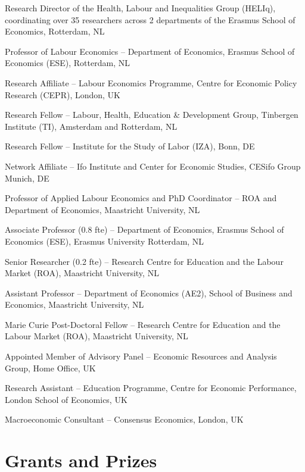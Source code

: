 \documentclass[11pt,a4paper]{article}
\begin{document}
\begin{datelist}
  \item[2024 --] Research Director of the Health, Labour and Inequalities Group (HELIq), coordinating over 35 researchers across 2 departments of the Erasmus School of Economics, Rotterdam, NL
  \item[2017 --] Professor of Labour Economics -- Department of Economics, Erasmus School of Economics (ESE), Rotterdam, NL
  \item[2017 --] Research Affiliate -- Labour Economics Programme, Centre for Economic Policy Research (CEPR), London, UK
  \item[2016 --] Research Fellow -- Labour, Health, Education \& Development Group, Tinbergen Institute (TI), Amsterdam and Rotterdam, NL
  \item[2014 --] Research Fellow -- Institute for the Study of Labor (IZA), Bonn, DE
  \item[2013 --] Network Affiliate -- Ifo Institute and Center for Economic Studies, CESifo Group Munich, DE
  \item[2017 -- 2023] Professor of Applied Labour Economics and PhD Coordinator -- ROA and Department of Economics, Maastricht University, NL
  \item[2016 -- 2017] Associate Professor (0.8 fte) -- Department of Economics, Erasmus School of Economics (ESE), Erasmus University Rotterdam, NL
  \item[2016 -- 2017] Senior Researcher (0.2 fte) -- Research Centre for Education and the Labour Market (ROA), Maastricht University, NL
  \item[2012 -- 2016] Assistant Professor -- Department of Economics (AE2), School of Business and Economics, Maastricht University, NL
  \item[2009 -- 2012] Marie Curie Post-Doctoral Fellow -- Research Centre for Education and the Labour Market (ROA), Maastricht University, NL
  \item[2009 -- 2011] Appointed Member of Advisory Panel -- Economic Resources and Analysis Group, Home Office, UK
  \item[2004 -- 2009] Research Assistant -- Education Programme, Centre for Economic Performance, London School of Economics, UK
  \item[2002 -- 2004] Macroeconomic Consultant -- Consensus Economics, London, UK
\end{datelist}

\section{Grants and Prizes}
\end{document}
